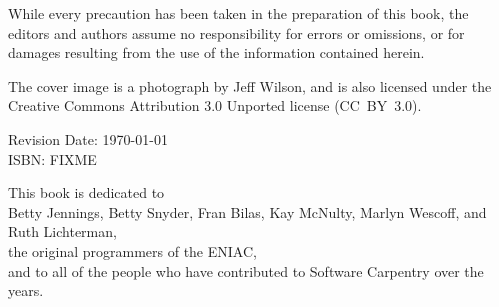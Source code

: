 \noindent While every precaution has been taken in the preparation of this
book, the editors and authors assume no responsibility for errors or omissions,
or for damages resulting from the use of the information contained herein.\\

\vspace{0.15cm}

\noindent The cover image is a photograph by Jeff Wilson, and 
is also licensed under the Creative Commons Attribution 3.0 Unported
license (CC~BY~3.0).

\vspace{1cm}

\noindent Revision Date: \today \\

\noindent ISBN: FIXME
\normalsize

\newpage

\thispagestyle{empty}

\vspace*{2cm}

\begin{center}
\noindent
This book is dedicated to\\ Betty Jennings, Betty Snyder, Fran Bilas,
Kay McNulty, Marlyn Wescoff, and Ruth Lichterman,\\ the original
programmers of the ENIAC,\\ and to all of the people who have
contributed to Software Carpentry over the years.
\end{center}

\newpage

\thispagestyle{empty}
\mbox{}    %
